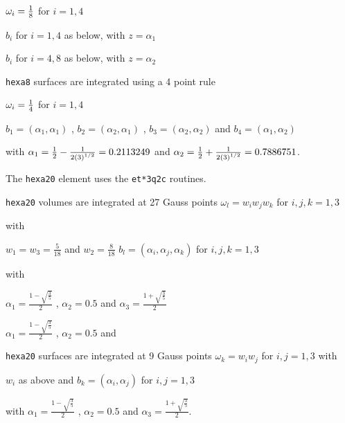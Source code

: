 $\omega_i = {1 \over 8}$ for $i=1,4$ 

$b_i$ for $i=1,4$  as below, with $z=\alpha_{1}$  

$b_i$ for $i=4,8$  as below, with $z=\alpha_{2}$

{\tt hexa8} surfaces are integrated using a 4 point rule

$\omega_i = {1 \over 4}$ for $i=1,4$

$b_1= ( \alpha_{1} , \alpha_{1} ) $ ,
      $b_2= ( \alpha_{2} , \alpha_{1} ) $ ,
      $b_3= ( \alpha_{2} , \alpha_{2} ) $ and
      $b_4= ( \alpha_{1} , \alpha_{2} ) $  

with $ \alpha_{1}= {1 \over 2}-{1 \over {2 \sqrt{3}}}=0.2113249$ and
           $ \alpha_{2}= {1 \over 2}+{1 \over {2 \sqrt{3}}}=0.7886751$.   

The {\tt hexa20} element uses the {\tt et*3q2c} routines.

{\tt hexa20} volumes are integrated at 27 Gauss points $\omega_l = w_i w_j w_k$ for $i,j,k=1,3$ 

with

$w_1 = w_3 = \frac{5}{18} $ and $w_2 = \frac{8}{18}  $
$b_l =  (\alpha_i, \alpha_j, \alpha_k) $  for $i,j,k=1,3$ 


with
%

 $ \alpha_1 = \frac{ 1 - \sqrt{\frac{3}{5}} }{2}  $ , $ \alpha_2 = 0.5 $ and 
 $ \alpha_3 = \frac{ 1 + \sqrt{\frac{3}{5}} }{2}  $

 $ \alpha_1 = \frac{  1 - \sqrt{\frac{3}{5}} }{2}  $ , $ \alpha_2 = 0.5 $ and 

{\tt hexa20} surfaces are integrated at 9 Gauss points $\omega_k = w_i w_j$ for $i,j=1,3$ with

$w_i $ as above and $b_k =  (\alpha_i, \alpha_j) $  for $i,j=1,3$ 

with
$ \alpha_1 =  \frac{ 1 - \sqrt{\frac{3}{5}} }{2} $ , $ \alpha_2 = 0.5 $ and 
$ \alpha_3 =  \frac{ 1 + \sqrt{\frac{3}{5}} }{2} $.



